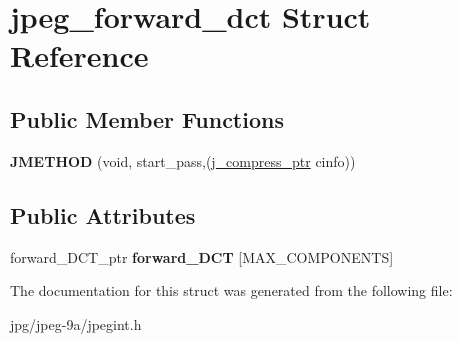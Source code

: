 \hypertarget{structjpeg__forward__dct}{\section{jpeg\+\_\+forward\+\_\+dct Struct Reference}
\label{structjpeg__forward__dct}
}
\subsection*{Public Member Functions}
\begin{DoxyCompactItemize}
\item 
\hypertarget{structjpeg__forward__dct_a51b3b61e60becc93a36b41e26fd2c616}{{\bfseries J\+M\+E\+T\+H\+O\+D} (void, start\+\_\+pass,(\hyperlink{structjpeg__compress__struct}{j\+\_\+compress\+\_\+ptr} cinfo))}\label{structjpeg__forward__dct_a51b3b61e60becc93a36b41e26fd2c616}

\end{DoxyCompactItemize}
\subsection*{Public Attributes}
\begin{DoxyCompactItemize}
\item 
\hypertarget{structjpeg__forward__dct_a227dc1b935c81ac94fc81521be709faf}{forward\+\_\+\+D\+C\+T\+\_\+ptr {\bfseries forward\+\_\+\+D\+C\+T} \mbox{[}M\+A\+X\+\_\+\+C\+O\+M\+P\+O\+N\+E\+N\+T\+S\mbox{]}}\label{structjpeg__forward__dct_a227dc1b935c81ac94fc81521be709faf}

\end{DoxyCompactItemize}


The documentation for this struct was generated from the following file\+:\begin{DoxyCompactItemize}
\item 
jpg/jpeg-\/9a/jpegint.\+h\end{DoxyCompactItemize}
